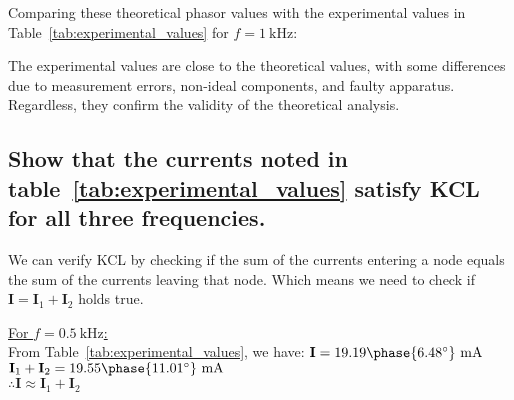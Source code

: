 \documentclass[12pt]{article}
\begin{document}
\begin{large}
	Comparing these theoretical phasor values with the experimental values in Table~\ref{tab:experimental_values} for $ f = \SI{1}{\kilo\hertz} $:

	\begin{table}[H]
		\caption{Comparison of Theoretical and Experimental Values at $ f = \SI{1}{\kilo\hertz} $}
		\label{tab:exp_theory_comparison}
	\end{table}

	The experimental values are close to the theoretical values, with some differences due to measurement errors, non-ideal components, and faulty apparatus. Regardless, they confirm the validity of the theoretical analysis.

	\subsection{Show that the currents noted in table~\ref{tab:experimental_values} satisfy KCL for all three frequencies.}
	We can verify KCL by checking if the sum of the currents entering a node equals the sum of the currents leaving that node. Which means we need to check if $ \mathbf{I} = \mathbf{I}_1 + \mathbf{I}_2 $ holds true.

		{
			\underline{For $ f = \SI{0.5}{\kilo\hertz} $:}\\
			From Table~\ref{tab:experimental_values}, we have:
			$ \mathbf{I} = 19.19\phase{6.48^\circ}~\SI{}{\milli\A} $\\
			$ \mathbf{I}_1 + \mathbf{I}_2 = 19.55\phase{11.01^\circ}~\SI{}{\milli\A} $\\
			$ \therefore \mathbf{I} \approx \mathbf{I}_1 + \mathbf{I}_2 $

}
\end{large}
\end{document}
